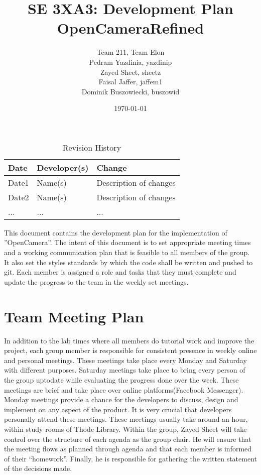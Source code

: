 \documentclass{article}
\title{SE 3XA3: Development Plan\\OpenCameraRefined}
\author{Team 211, Team Elon
		\\ Pedram Yazdinia, yazdinip
		\\ Zayed Sheet, sheetz
		\\ Faisal Jaffer, jaffem1
		\\ Dominik Buszowiecki, buszowid 
}
\date{\today}
\begin{document}
\begin{table}[hp]
\caption{Revision History} \label{TblRevisionHistory}
\begin{tabularx}{\textwidth}{llX}
\toprule
\textbf{Date} & \textbf{Developer(s)} & \textbf{Change}\\
\midrule
Date1 & Name(s) & Description of changes\\
Date2 & Name(s) & Description of changes\\
... & ... & ...\\
\bottomrule
\end{tabularx}
\end{table}

\newpage

\maketitle


This document contains the development plan for the implementation of ''OpenCamera”. The intent of this document is to set appropriate meeting times and a working communication plan that is feasible to all members of the group. It also set the styles standards by which the code shall be written and pushed to git. Each member is assigned a role and tasks that they must complete and update the progress to the team in the weekly set meetings.


\section{Team Meeting Plan}

In addition to the lab times where all members do tutorial work and improve the project, each group member is responsible for consistent presence in weekly online and personal meetings. These meetings take place every Monday and Saturday with different purposes. Saturday meetings take place to bring every person of the group uptodate while evaluating the progress done over the week. These meetings are brief and take place over online platforms(Facebook Messenger). Monday meetings provide a chance for the developers to discuss, design and implement on any aspect of the product. It is very crucial that developers personally attend these meetings. These meetings usually take around an hour, within study rooms of Thode Library. Within the group, Zayed Sheet will take control over the structure of each agenda as the group chair. He will ensure that the meeting flows as planned through agenda and that each member is informed of their “homework”. Finally, he is responsible for gathering the written statement of the decisions made. 
\end{document}
